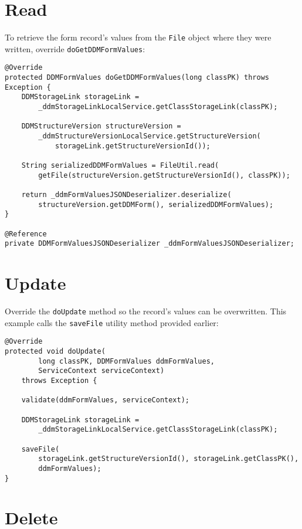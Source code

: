 \section{Read}\label{read}

To retrieve the form record's values from the \texttt{File} object where
they were written, override \texttt{doGetDDMFormValues}:

\begin{verbatim}
@Override
protected DDMFormValues doGetDDMFormValues(long classPK) throws Exception {
    DDMStorageLink storageLink =
        _ddmStorageLinkLocalService.getClassStorageLink(classPK);

    DDMStructureVersion structureVersion =
        _ddmStructureVersionLocalService.getStructureVersion(
            storageLink.getStructureVersionId());

    String serializedDDMFormValues = FileUtil.read(
        getFile(structureVersion.getStructureVersionId(), classPK));

    return _ddmFormValuesJSONDeserializer.deserialize(
        structureVersion.getDDMForm(), serializedDDMFormValues);
}

@Reference
private DDMFormValuesJSONDeserializer _ddmFormValuesJSONDeserializer;
\end{verbatim}

\section{Update}\label{update}

Override the \texttt{doUpdate} method so the record's values can be
overwritten. This example calls the \texttt{saveFile} utility method
provided earlier:

\begin{verbatim}
@Override
protected void doUpdate(
        long classPK, DDMFormValues ddmFormValues,
        ServiceContext serviceContext)
    throws Exception {

    validate(ddmFormValues, serviceContext);

    DDMStorageLink storageLink =
        _ddmStorageLinkLocalService.getClassStorageLink(classPK);

    saveFile(
        storageLink.getStructureVersionId(), storageLink.getClassPK(),
        ddmFormValues);
}
\end{verbatim}

\section{Delete}\label{delete}


